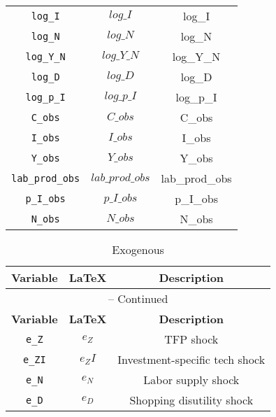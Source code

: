 \begin{center}
\begin{longtable}{ccc}
\texttt{log\_I} & $log\_I$ & log\_I\\
\texttt{log\_N} & $log\_N$ & log\_N\\
\texttt{log\_Y\_N} & $log\_Y\_N$ & log\_Y\_N\\
\texttt{log\_D} & $log\_D$ & log\_D\\
\texttt{log\_p\_I} & $log\_p\_I$ & log\_p\_I\\
\texttt{C\_obs} & $C\_obs$ & C\_obs\\
\texttt{I\_obs} & $I\_obs$ & I\_obs\\
\texttt{Y\_obs} & $Y\_obs$ & Y\_obs\\
\texttt{lab\_prod\_obs} & $lab\_prod\_obs$ & lab\_prod\_obs\\
\texttt{p\_I\_obs} & $p\_I\_obs$ & p\_I\_obs\\
\texttt{N\_obs} & $N\_obs$ & N\_obs\\
\hline%
\end{longtable}
\end{center}
\begin{center}
\begin{longtable}{ccc}
\caption{Exogenous}\\%
\hline%
\multicolumn{1}{c}{\textbf{Variable}} &
\multicolumn{1}{c}{\textbf{\LaTeX}} &
\multicolumn{1}{c}{\textbf{Description}}\\%
\hline\hline%
\endfirsthead
\multicolumn{3}{c}{{\tablename} \thetable{} -- Continued}\\%
\hline%
\multicolumn{1}{c}{\textbf{Variable}} &
\multicolumn{1}{c}{\textbf{\LaTeX}} &
\multicolumn{1}{c}{\textbf{Description}}\\%
\hline\hline%
\endhead
\texttt{e\_Z} & ${e_Z}$ & TFP shock\\
\texttt{e\_ZI} & ${e_ZI}$ & Investment-specific tech shock\\
\texttt{e\_N} & ${e_N}$ & Labor supply shock\\
\texttt{e\_D} & ${e_D}$ & Shopping disutility shock\\
\hline%
\end{longtable}
\end{center}

